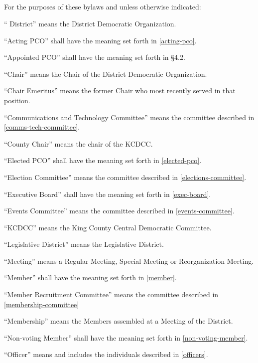 \subsection{}
For the purposes of these bylaws and unless otherwise indicated:
\begin{alphalist}
    \item “ District” means the \fortythird{} District Democratic Organization.
    \item “Acting PCO” shall have the meaning set forth in \autoref{acting-pco}.
    \item “Appointed PCO” shall have the meaning set forth in \S 4.2.
    \item “Chair” means the Chair of the \fortythird{} District Democratic Organization.
    \item “Chair Emeritus” means the former Chair who most recently served in that position.
    \item “Communications and Technology Committee” means the committee described in \autoref{comms-tech-committee}.
    \item “County Chair” means the chair of the KCDCC.
    \item “Elected PCO” shall have the meaning set forth in \autoref{elected-pco}.
    \item “Election Committee” means the committee described in \autoref{elections-committee}.
    \item “Executive Board” shall have the meaning set forth in \autoref{exec-board}.
    \item “Events Committee” means the committee described in \autoref{events-committee}.
    \item “KCDCC” means the King County Central Democratic Committee.
    \item “Legislative District” means the \fortythird{} Legislative District.
    \item “Meeting” means a Regular Meeting, Special Meeting or Reorganization Meeting.
    \item “Member” shall have the meaning set forth in \autoref{member}.
    \item “Member Recruitment Committee” means the committee described in \autoref{membership-committee}
    \item “Membership” means the Members assembled at a Meeting of the \fortythird{} District.
    \item “Non-voting Member” shall have the meaning set forth in \autoref{non-voting-member}.
    \item “Officer” means and includes the individuals described in \autoref{officers}.

\end{alphalist}
